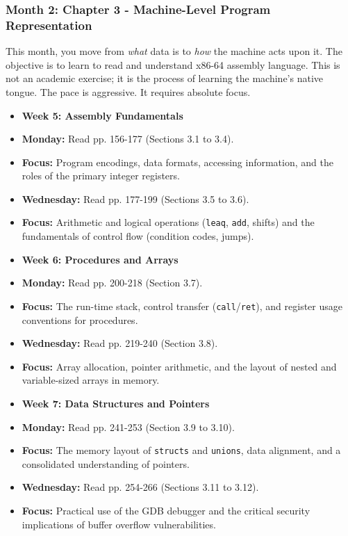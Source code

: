 \subsubsection{\textbf{Month 2: Chapter 3 - Machine-Level Program Representation}}

This month, you move from \textit{what} data is to \textit{how} the machine acts upon it. The objective is to learn to read and understand x86-64 assembly language. This is not an academic exercise; it is the process of learning the machine's native tongue. The pace is aggressive. It requires absolute focus.

\begin{itemize}
  \item \textbf{Week 5: Assembly Fundamentals}
  \item \textbf{Monday:} Read pp. 156-177 (Sections 3.1 to 3.4).
  \item \textbf{Focus:} Program encodings, data formats, accessing information, and the roles of the primary integer registers.
  \item \textbf{Wednesday:} Read pp. 177-199 (Sections 3.5 to 3.6).
  \item \textbf{Focus:} Arithmetic and logical operations (\texttt{leaq}, \texttt{add}, shifts) and the fundamentals of control flow (condition codes, jumps).

  \item \textbf{Week 6: Procedures and Arrays}
  \item \textbf{Monday:} Read pp. 200-218 (Section 3.7).
  \item \textbf{Focus:} The run-time stack, control transfer (\texttt{call}/\texttt{ret}), and register usage conventions for procedures.
  \item \textbf{Wednesday:} Read pp. 219-240 (Section 3.8).
  \item \textbf{Focus:} Array allocation, pointer arithmetic, and the layout of nested and variable-sized arrays in memory.

  \item \textbf{Week 7: Data Structures and Pointers}
  \item \textbf{Monday:} Read pp. 241-253 (Section 3.9 to 3.10).
  \item \textbf{Focus:} The memory layout of \texttt{structs} and \texttt{unions}, data alignment, and a consolidated understanding of pointers.
  \item \textbf{Wednesday:} Read pp. 254-266 (Sections 3.11 to 3.12).
  \item \textbf{Focus:} Practical use of the GDB debugger and the critical security implications of buffer overflow vulnerabilities.


\end{itemize}
